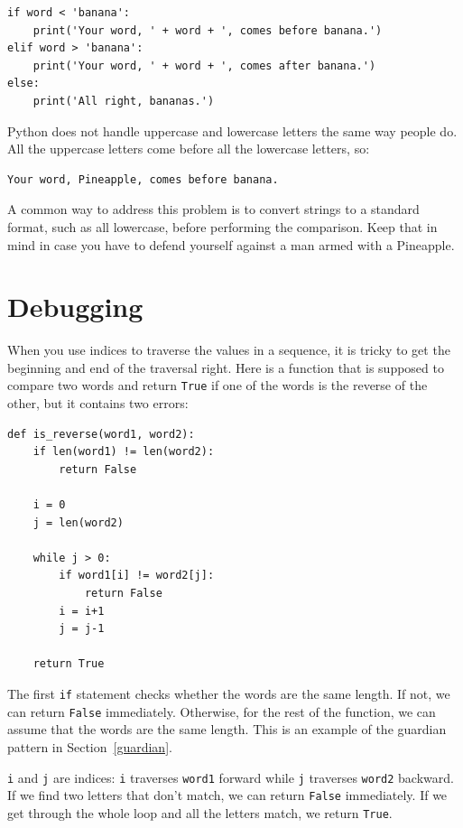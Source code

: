 \documentclass[10pt]{book}
\begin{document}
\begin{verbatim}
if word < 'banana':
    print('Your word, ' + word + ', comes before banana.')
elif word > 'banana':
    print('Your word, ' + word + ', comes after banana.')
else:
    print('All right, bananas.')
\end{verbatim}
%
Python does not handle uppercase and lowercase letters the same way
people do.  All the uppercase letters come before all the
lowercase letters, so:

\begin{verbatim}
Your word, Pineapple, comes before banana.
\end{verbatim}
%
A common way to address this problem is to convert strings to a
standard format, such as all lowercase, before performing the
comparison.  Keep that in mind in case you have to defend yourself
against a man armed with a Pineapple.


\section{Debugging}

When you use indices to traverse the values in a sequence,
it is tricky to get the beginning and end of the traversal
right.  Here is a function that is supposed to compare two
words and return {\tt True} if one of the words is the reverse
of the other, but it contains two errors:

\begin{verbatim}
def is_reverse(word1, word2):
    if len(word1) != len(word2):
        return False

    i = 0
    j = len(word2)

    while j > 0:
        if word1[i] != word2[j]:
            return False
        i = i+1
        j = j-1

    return True
\end{verbatim}
%
The first {\tt if} statement checks whether the words are the
same length.  If not, we can return {\tt False} immediately.
Otherwise, for the rest of the function, we can assume that the words
are the same length.  This is an example of the guardian pattern
in Section~\ref{guardian}.

{\tt i} and {\tt j} are indices: {\tt i} traverses {\tt word1}
forward while {\tt j} traverses {\tt word2} backward.  If we find
two letters that don't match, we can return {\tt False} immediately.
If we get through the whole loop and all the letters match, we
return {\tt True}.
\end{document}
